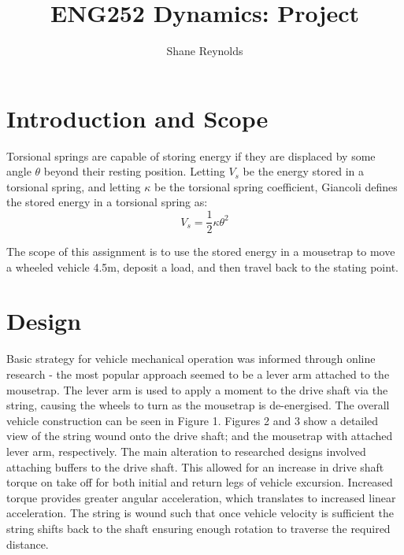 \documentclass[a4paper]{article}
\begin{document}
\title{ENG252 Dynamics: Project}
\author{Shane Reynolds}
\maketitle

\section{Introduction and Scope}
Torsional springs are capable of storing energy if they are displaced by some angle $\theta$ beyond their resting position. Letting $V_s$ be the energy stored in a torsional spring, and letting $\kappa$ be the torsional spring coefficient, Giancoli \cite{Giancoli:2000} defines the stored energy in a torsional spring as:
\begin{equation}
	V_s = \frac{1}{2} \kappa \theta^2
\end{equation}

The scope of this assignment is to use the stored energy in a mousetrap to move a wheeled vehicle 4.5$\si{\meter}$, deposit a load, and then travel back to the stating point.

\section{Design}
Basic strategy for vehicle mechanical operation was informed through online research - the most popular approach seemed to be a lever arm attached to the mousetrap. The lever arm is used to apply a moment to the drive shaft via the string, causing the wheels to turn as the mousetrap is de-energised. The overall vehicle construction can be seen in Figure 1. Figures 2 and 3 show a detailed view of the string wound onto the drive shaft; and the mousetrap with attached lever arm, respectively. The main alteration to researched designs involved attaching buffers to the drive shaft. This allowed for an increase in drive shaft torque on take off for both initial and return legs of vehicle excursion. Increased torque provides greater angular acceleration, which translates to increased linear acceleration. The string is wound such that once vehicle velocity is sufficient the string shifts back to the shaft ensuring enough rotation to traverse the required distance.
\end{document}
